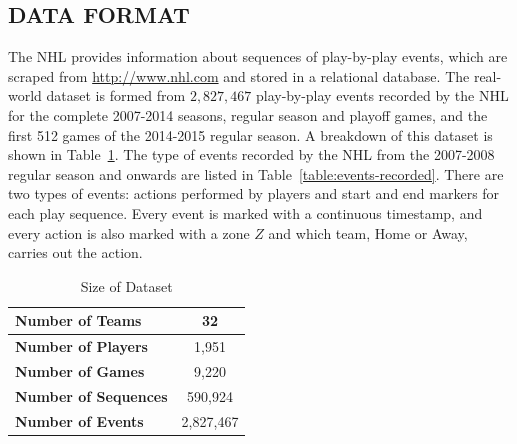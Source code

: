\documentclass[]{article}
\begin{document}
\subsection{DATA FORMAT}

The NHL provides information about sequences of play-by-play events, which are scraped from \url{http://www.nhl.com} and stored in a relational database. The real-world dataset is formed from $2,827,467$ play-by-play events recorded by the NHL for the complete 2007-2014 seasons, regular season and playoff games, and the first 512 games of the 2014-2015 regular season. A breakdown of this dataset is shown in Table~\ref{table:size-of-dataset}. %
The type of events recorded by the NHL from the 2007-2008 regular season and onwards are listed in Table~\ref{table:events-recorded}. There are two types of events: actions performed by players and start and end markers for each play sequence. Every event is marked with a continuous timestamp, and every action is also marked with a zone $Z$ and which team, Home or Away, carries out the action.%

\begin{table}[htb]
\caption{Size of Dataset}
\label{table:size-of-dataset}
\begin{center}
\begin{tabular}{|l|c|}
\hline
\bf{Number of Teams} & 32 \\ \hline
\bf{Number of Players} & 1,951 \\ \hline
\bf{Number of Games} & 9,220 \\ \hline
\bf{Number of Sequences} & 590,924 \\ \hline
\bf{Number of Events} & 2,827,467 \\ \hline
\end{tabular}
\end{center}
\end{table}
\end{document}

